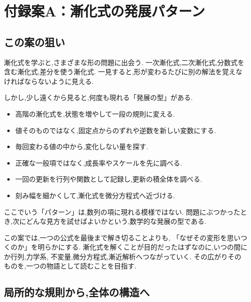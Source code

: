 
\chapter{付録案A：漸化式の発展パターン}

\section*{この案の狙い}

漸化式を学ぶと,さまざまな形の問題に出会う.
一次漸化式,二次漸化式,分数式を含む漸化式,差分を使う漸化式.
一見すると,形が変わるたびに別の解法を覚えなければならないように見える.

しかし,少し遠くから見ると,何度も現れる「発展の型」がある.

\begin{itemize}
  \item 高階の漸化式を,状態を増やして一段の規則に変える.
  \item 値そのものではなく,固定点からのずれや逆数を新しい変数にする.
  \item 毎回変わる値の中から,変化しない量を探す.
  \item 正確な一般項ではなく,成長率やスケールを先に調べる.
  \item 一回の更新を行列や関数として記録し,更新の積全体を調べる.
  \item 刻み幅を細かくして,漸化式を微分方程式へ近づける.
\end{itemize}

ここでいう「パターン」は,数列の項に現れる模様ではない.
問題にぶつかったとき,次にどんな見方を試せばよいかという,数学的な発展の型である.

この案では,一つの公式を最後まで解き切ることよりも,
「なぜその変形を思いつくのか」を明らかにする.
漸化式を解くことが目的だったはずなのに,いつの間にか行列,力学系,
不変量,微分方程式,漸近解析へつながっていく.
その広がりそのものを,一つの物語として読むことを目指す.

\section{局所的な規則から,全体の構造へ}

